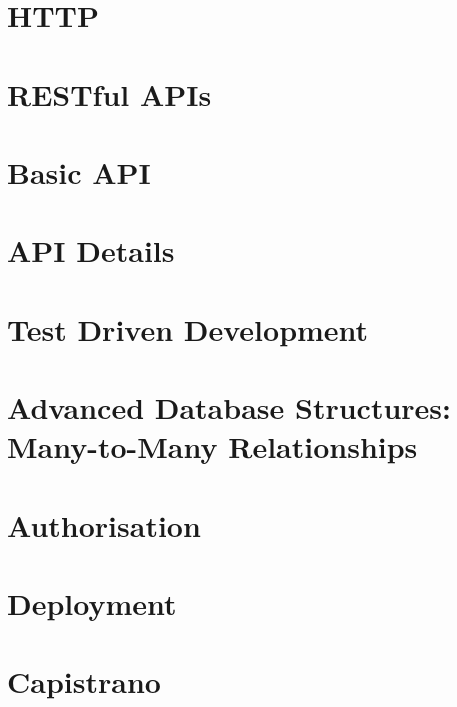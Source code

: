 \documentclass[b5paper,openany]{book}
\begin{document}
\tp


\tableofcontents



\chapter{HTTP}


\chapter{RESTful APIs}


\chapter{Basic API}


\chapter{API Details}


\chapter{Test Driven Development}


\chapter{Advanced Database Structures: Many-to-Many Relationships}


\chapter{Authorisation}


\chapter{Deployment}


\chapter{Capistrano}






\end{document}
